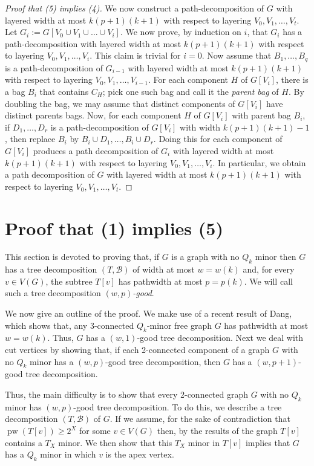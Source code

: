 \documentclass[a4paper,11pt]{article}
\DeclareMathOperator{\pw}{pw}
\theoremstyle{plain}
\theoremstyle{definition}
\begin{document}
\begin{proof}[Proof that (5) implies (4)]
We now construct a path-decomposition of $G$ with layered width at most $k(p+1)(k+1)$ with respect to layering $V_0,V_1,\dots,V_t$. Let $G_i:=G[V_0\cup V_1\cup\dots\cup V_i]$. We now prove, by induction on $i$, that $G_i$ has a 
 path-decomposition with layered width at most $k(p+1)(k+1)$ with respect to layering $V_0,V_1,\dots,V_i$. This claim is trivial for $i=0$. Now assume that $B_1,\dots,B_q$ is a path-decomposition of $G_{i-1}$ with layered width at most $k(p+1)(k+1)$ with respect to layering $V_0,V_1,\dots,V_{i-1}$. For each component $H$ of $G[V_i]$, there is a bag $B_i$ that contains $C_H$; pick one such bag and call it the \emph{parent bag} of $H$. By doubling the bag, we may assume that distinct components of $G[V_i]$ have distinct parents bags. Now, for each component $H$ of $G[V_i]$ with parent bag $B_i$, if $D_1,\dots,D_r$ is a path-decomposition of $G[V_i]$ with width  $k(p+1)(k+1)-1$, then replace $B_i$ by  
 $B_i\cup D_1,\dots,B_i\cup D_r$. Doing this for each component of $G[V_i]$ produces a path decomposition of $G_i$ 
 with layered width at most $k(p+1)(k+1)$ with respect to layering $V_0,V_1,\dots,V_i$. In particular, we obtain a path decomposition of $G$  with layered width at most $k(p+1)(k+1)$ with respect to layering $V_0,V_1,\dots,V_t$.
 \end{proof}

\section{Proof that (1) implies (5)}
\label{hard-section}

This section is devoted to proving that, if
$G$ is a graph with no $Q_k$ minor then $G$ has a tree decomposition
$(T,\mathcal{B})$ of width at most $w=w(k)$ and, for every $v\in V(G)$,
the subtree $T[v]$ has pathwidth at most $p=p(k)$.  We will
call such a tree decomposition \emph{$(w,p)$-good}.

We now give an outline of the proof.  We make use of a recent result
of Dang, which shows that, any 3-connected $Q_k$-minor free graph
$G$ has pathwidth at most $w=w(k)$.  Thus, $G$ has a $(w,1)$-good
tree decomposition.  Next we deal with cut vertices by showing that,
if each 2-connected component of a graph $G$ with no $Q_k$ minor has
a $(w,p)$-good tree decomposition, then $G$ has a $(w,p+1)$-good tree
decomposition.

Thus, the main difficulty is to show that every 2-connected graph $G$
with no $Q_k$ minor has $(w,p)$-good tree decomposition.  To do this, we
describe a tree decomposition $(T,\mathcal{B})$ of $G$.  If we assume,
for the sake of contradiction that $\pw(T[v])\ge 2^X$ for some $v\in
V(G)$ then, by the results of \citet{BRST-JCTB91} the graph $T[v]$
contains a $T_X$ minor.  We then show that this $T_X$ minor in $T[v]$
implies that $G$ has a $Q_k$ minor in which $v$ is the apex vertex.
\end{document}
